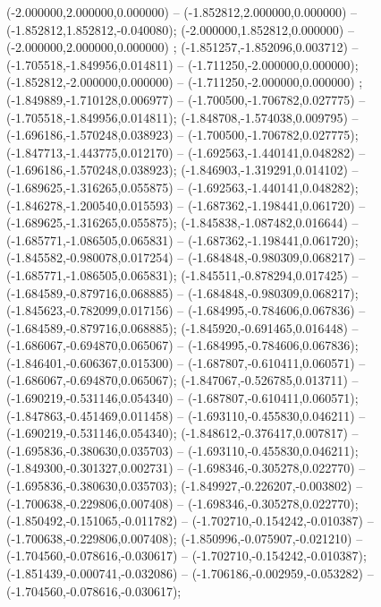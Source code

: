  (-2.000000,2.000000,0.000000) -- (-1.852812,2.000000,0.000000) -- (-1.852812,1.852812,-0.040080);
 (-2.000000,1.852812,0.000000) -- (-2.000000,2.000000,0.000000) ;
 (-1.851257,-1.852096,0.003712) -- (-1.705518,-1.849956,0.014811) -- (-1.711250,-2.000000,0.000000);
 (-1.852812,-2.000000,0.000000) -- (-1.711250,-2.000000,0.000000) ;
 (-1.849889,-1.710128,0.006977) -- (-1.700500,-1.706782,0.027775) -- (-1.705518,-1.849956,0.014811);
 (-1.848708,-1.574038,0.009795) -- (-1.696186,-1.570248,0.038923) -- (-1.700500,-1.706782,0.027775);
 (-1.847713,-1.443775,0.012170) -- (-1.692563,-1.440141,0.048282) -- (-1.696186,-1.570248,0.038923);
 (-1.846903,-1.319291,0.014102) -- (-1.689625,-1.316265,0.055875) -- (-1.692563,-1.440141,0.048282);
 (-1.846278,-1.200540,0.015593) -- (-1.687362,-1.198441,0.061720) -- (-1.689625,-1.316265,0.055875);
 (-1.845838,-1.087482,0.016644) -- (-1.685771,-1.086505,0.065831) -- (-1.687362,-1.198441,0.061720);
 (-1.845582,-0.980078,0.017254) -- (-1.684848,-0.980309,0.068217) -- (-1.685771,-1.086505,0.065831);
 (-1.845511,-0.878294,0.017425) -- (-1.684589,-0.879716,0.068885) -- (-1.684848,-0.980309,0.068217);
 (-1.845623,-0.782099,0.017156) -- (-1.684995,-0.784606,0.067836) -- (-1.684589,-0.879716,0.068885);
 (-1.845920,-0.691465,0.016448) -- (-1.686067,-0.694870,0.065067) -- (-1.684995,-0.784606,0.067836);
 (-1.846401,-0.606367,0.015300) -- (-1.687807,-0.610411,0.060571) -- (-1.686067,-0.694870,0.065067);
 (-1.847067,-0.526785,0.013711) -- (-1.690219,-0.531146,0.054340) -- (-1.687807,-0.610411,0.060571);
 (-1.847863,-0.451469,0.011458) -- (-1.693110,-0.455830,0.046211) -- (-1.690219,-0.531146,0.054340);
 (-1.848612,-0.376417,0.007817) -- (-1.695836,-0.380630,0.035703) -- (-1.693110,-0.455830,0.046211);
 (-1.849300,-0.301327,0.002731) -- (-1.698346,-0.305278,0.022770) -- (-1.695836,-0.380630,0.035703);
 (-1.849927,-0.226207,-0.003802) -- (-1.700638,-0.229806,0.007408) -- (-1.698346,-0.305278,0.022770);
 (-1.850492,-0.151065,-0.011782) -- (-1.702710,-0.154242,-0.010387) -- (-1.700638,-0.229806,0.007408);
 (-1.850996,-0.075907,-0.021210) -- (-1.704560,-0.078616,-0.030617) -- (-1.702710,-0.154242,-0.010387);
 (-1.851439,-0.000741,-0.032086) -- (-1.706186,-0.002959,-0.053282) -- (-1.704560,-0.078616,-0.030617);
